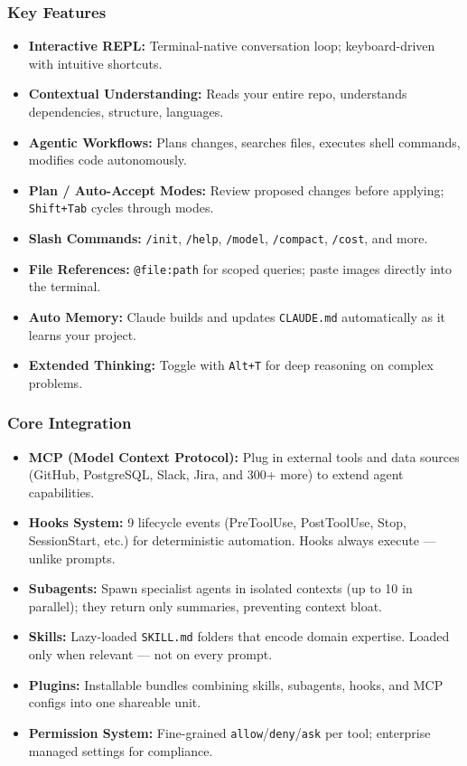 \begin{frame}[fragile]\frametitle{Key Features}
  \begin{itemize}
    \item \textbf{Interactive REPL:} Terminal-native conversation loop; keyboard-driven with intuitive shortcuts.
    \item \textbf{Contextual Understanding:} Reads your entire repo, understands dependencies, structure, languages.
    \item \textbf{Agentic Workflows:} Plans changes, searches files, executes shell commands, modifies code autonomously.
    \item \textbf{Plan / Auto-Accept Modes:} Review proposed changes before applying; \texttt{Shift+Tab} cycles through modes.
    \item \textbf{Slash Commands:} \texttt{/init}, \texttt{/help}, \texttt{/model}, \texttt{/compact}, \texttt{/cost}, and more.
    \item \textbf{File References:} \texttt{@file:path} for scoped queries; paste images directly into the terminal.
    \item \textbf{Auto Memory:} Claude builds and updates \texttt{CLAUDE.md} automatically as it learns your project.
    \item \textbf{Extended Thinking:} Toggle with \texttt{Alt+T} for deep reasoning on complex problems.
  \end{itemize}
\end{frame}

\begin{frame}[fragile]\frametitle{Core Integration}
  \begin{itemize}
    \item \textbf{MCP (Model Context Protocol):} Plug in external tools and data sources (GitHub, PostgreSQL, Slack, Jira, and 300+ more) to extend agent capabilities.
    \item \textbf{Hooks System:} 9 lifecycle events (PreToolUse, PostToolUse, Stop, SessionStart, etc.) for deterministic automation. Hooks always execute --- unlike prompts.
    \item \textbf{Subagents:} Spawn specialist agents in isolated contexts (up to 10 in parallel); they return only summaries, preventing context bloat.
    \item \textbf{Skills:} Lazy-loaded \texttt{SKILL.md} folders that encode domain expertise. Loaded only when relevant --- not on every prompt.
    \item \textbf{Plugins:} Installable bundles combining skills, subagents, hooks, and MCP configs into one shareable unit.
    \item \textbf{Permission System:} Fine-grained \texttt{allow}/\texttt{deny}/\texttt{ask} per tool; enterprise managed settings for compliance.
  \end{itemize}
\end{frame}


